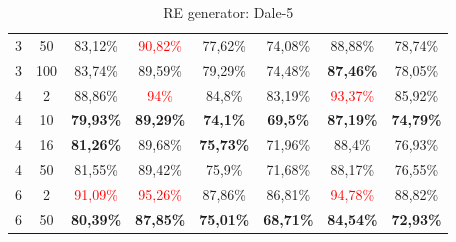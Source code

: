 \begin{table}[ht]
\begin{tabular}{cc|c|c|c|c|c|c}
        {3} & {50}  & {83,12\%}                & \textcolor{red}{90,82\%} & {77,62\%}                & {74,08\%}            & {88,88\%}                & {78,74\%}                \\
        {3} & {100} & {83,74\%}                & {89,59\%}                & {79,29\%}                & {74,48\%}            & \textbf{87,46\%}         & {78,05\%}                \\
        {4} & {2}   & {88,86\%}                & \textcolor{red}{94\%}    & {84,8\%}                 & {83,19\%}            & \textcolor{red}{93,37\%} & {85,92\%}                \\
        {4} & {10}  & \textbf{79,93\%}         & \textbf{89,29\%}         & \textbf{74,1\%}          & \textbf{69,5\%}      & \textbf{87,19\%}         & \textbf{74,79\%}         \\
        {4} & {16}  & \textbf{81,26\%}         & {89,68\%}                & \textbf{75,73\%}         & {71,96\%}            & {88,4\%}                 & {76,93\%}                \\
        {4} & {50}  & {81,55\%}                & {89,42\%}                & {75,9\%}                 & {71,68\%}            & {88,17\%}                & {76,55\%}                \\
        {6} & {2}   & \textcolor{red}{91,09\%} & \textcolor{red}{95,26\%} & {87,86\%}                & {86,81\%}            & \textcolor{red}{94,78\%} & {88,82\%}                \\
        {6} & {50}  & \textbf{80,39\%}         & \textbf{87,85\%}         & \textbf{75,01\%}         & \textbf{68,71\%}     & \textbf{84,54\%}         & \textbf{72,93\%}         \\
        \bottomrule
    \end{tabular}
    \caption{RE generator: Dale-5}
    \label{tab:probing:re-generator:dale-5}
\end{table}

